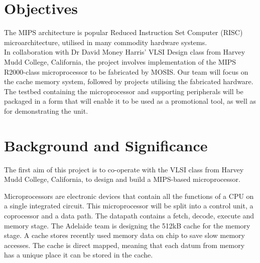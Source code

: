 \documentclass[a4paper,12pt]{article}
\begin{document}
\newpage
\section*{Objectives}
The MIPS architecture is popular Reduced Instruction Set Computer (RISC) microarchitecture, utilised in many commodity hardware systems.
\\In collaboration with Dr David Money Harris' VLSI Design class from Harvey Mudd College, California, the project involves implementation of the MIPS R2000-class microprocessor to be fabricated by MOSIS. Our team will focus on the cache memory system, followed by projects utilising the fabricated hardware.
\\The testbed containing the microprocessor and supporting peripherals will be packaged in a form that will enable it to be used as a promotional tool, as well as for demonstrating the unit.

\newpage
\tableofcontents

\newpage
\section{Background and Significance}

The first aim of this project is to co-operate with the VLSI class
from Harvey Mudd College, California, to design and build a MIPS-based
microprocessor.

Microprocessors are electronic devices that contain all the functions
of a CPU on a single integrated circuit. This microprocessor will be
split into a control unit, a coprocessor and a data path. The datapath
contains a fetch, decode, execute and memory stage. The Adelaide team
is designing the 512kB cache for the memory stage. A cache stores
recently used memory data on chip to save slow memory accesses. The
cache is direct mapped, meaning that each datum from memory has a
unique place it can be stored in the cache.
\end{document}

